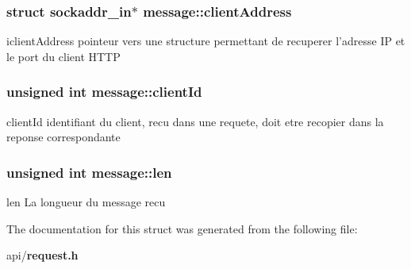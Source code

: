 \subsubsection[{client\+Address}]{\setlength{\rightskip}{0pt plus 5cm}struct sockaddr\+\_\+in$\ast$ message\+::client\+Address}\label{structmessage_a3c3a02f02d5ba650223498f95f30cb4c}
iclient\+Address pointeur vers une structure permettant de recuperer l'adresse I\+P et le port du client H\+T\+T\+P 
\subsubsection[{client\+Id}]{\setlength{\rightskip}{0pt plus 5cm}unsigned int message\+::client\+Id}\label{structmessage_a14bfec4a2137426f4b33df4c470310da}
client\+Id identifiant du client, recu dans une requete, doit etre recopier dans la reponse correspondante 
\subsubsection[{len}]{\setlength{\rightskip}{0pt plus 5cm}unsigned int message\+::len}\label{structmessage_a24bc7afeef646e268eefce5086872da8}
len La longueur du message recu 

The documentation for this struct was generated from the following file\+:\begin{DoxyCompactItemize}
\item 
api/{\bf request.\+h}\end{DoxyCompactItemize}
